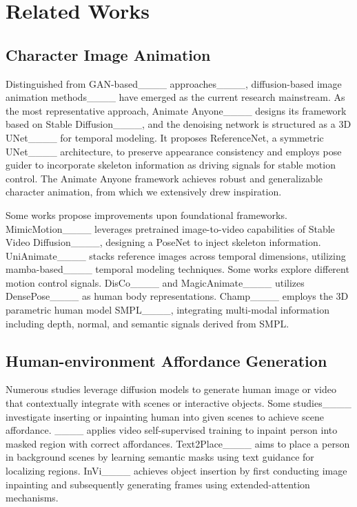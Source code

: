 \section{Related Works}
\subsection{Character Image Animation}
Distinguished from GAN-based____ approaches____, diffusion-based image animation methods____ have emerged as the current research mainstream. As the most representative approach, Animate Anyone____ designs its framework based on Stable Diffusion____, and the denoising network is structured as a 3D UNet____ for temporal modeling. It proposes ReferenceNet, a symmetric UNet____ architecture, to preserve appearance consistency and employs pose guider to incorporate skeleton information as driving signals for stable motion control. The Animate Anyone framework achieves robust and generalizable character animation, from which we extensively drew inspiration.

Some works propose improvements upon foundational frameworks. MimicMotion____ leverages pretrained image-to-video capabilities of Stable Video Diffusion____, designing a PoseNet to inject skeleton information. UniAnimate____ stacks reference images across temporal dimensions, utilizing mamba-based____ temporal modeling techniques. Some works explore different motion control signals. DisCo____ and MagicAnimate____ utilizes DensePose____ as human body representations. Champ____ employs the 3D parametric human model SMPL____, integrating multi-modal information including depth, normal, and semantic signals derived from SMPL.





\subsection{Human-environment Affordance Generation}
Numerous studies leverage diffusion models to generate human image or video that contextually integrate with scenes or interactive objects. Some studies____ investigate inserting or inpainting human into given scenes to achieve scene affordance. ____ applies video self-supervised training to inpaint person into masked region with correct affordances. Text2Place____ aims to place a person in background scenes by learning semantic masks using text guidance for localizing regions. InVi____ achieves object insertion by first conducting image inpainting and subsequently generating frames using extended-attention mechanisms.

